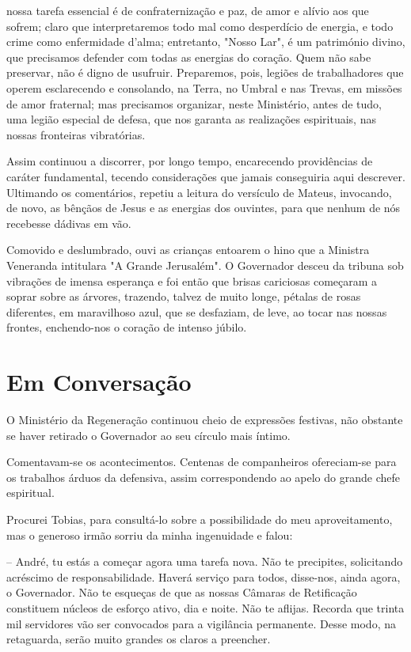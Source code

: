 \documentclass[portuguese,12pt,a4paper]{scrbook}
\begin{document}
	
	nossa tarefa essencial é de confraternização e paz, de amor e alívio aos que sofrem; claro que interpretaremos todo mal como desperdício de energia, e todo crime como enfermidade d’alma; entretanto, "Nosso Lar", é um património divino, que precisamos defender com todas as energias do coração. Quem não sabe preservar, não é digno de usufruir. Preparemos, pois, legiões de trabalhadores que operem esclarecendo e consolando, na Terra, no Umbral e nas Trevas, em missões de amor fraternal; mas precisamos organizar, neste Ministério, antes de tudo, uma legião especial de defesa, que nos garanta as realizações espirituais, nas nossas fronteiras vibratórias.
	
	Assim continuou a discorrer, por longo tempo, encarecendo providências de caráter fundamental, tecendo considerações que jamais conseguiria aqui descrever. Ultimando os comentários, repetiu a leitura do versículo de Mateus, invocando, de novo, as bênçãos de Jesus e as energias dos ouvintes, para que nenhum de nós recebesse dádivas em vão.
	
	Comovido e deslumbrado, ouvi as crianças entoarem o hino que a Ministra Veneranda intitulara "A Grande Jerusalém". O Governador desceu da tribuna sob vibrações de imensa esperança e foi então que brisas cariciosas começaram a soprar sobre as árvores, trazendo, talvez de muito longe, pétalas de rosas diferentes, em maravilhoso azul, que se desfaziam, de leve, ao tocar nas nossas frontes, enchendo-nos o coração de intenso júbilo.
	
	
	\chapter{Em Conversação}
	
	O Ministério da Regeneração continuou cheio de expressões festivas, não obstante se haver retirado o Governador ao seu círculo mais íntimo.
	
	Comentavam-se os acontecimentos. Centenas de companheiros ofereciam-se para os trabalhos árduos da defensiva, assim correspondendo ao apelo do grande chefe espiritual.
	
	Procurei Tobias, para consultá-lo sobre a possibilidade do meu aproveitamento, mas o generoso irmão sorriu da minha ingenuidade e falou:
	
	– André, tu estás a começar agora uma tarefa nova. Não te precipites, solicitando acréscimo de responsabilidade. Haverá serviço para todos, disse-nos, ainda agora, o Governador. Não te esqueças de que as nossas Câmaras de Retificação constituem núcleos de esforço ativo, dia e noite. Não te aflijas. Recorda que trinta mil servidores vão ser convocados para a vigilância permanente. Desse modo, na retaguarda, serão muito grandes os claros a preencher.
	
\end{document}
